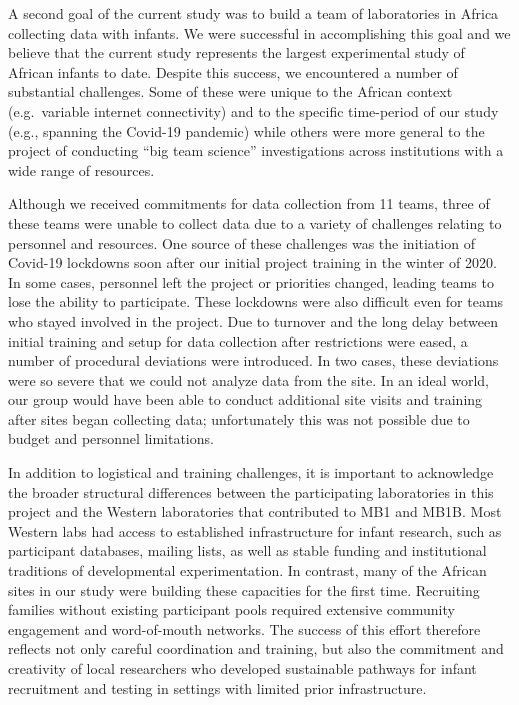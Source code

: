 \documentclass[
  ,man,floatsintext]{apa6}
\begin{document}
A second goal of the current study was to build a team of laboratories in Africa collecting data with infants. We were successful in accomplishing this goal and we believe that the current study represents the largest experimental study of African infants to date. Despite this success, we encountered a number of substantial challenges. Some of these were unique to the African context (e.g.~variable internet connectivity) and to the specific time-period of our study (e.g., spanning the Covid-19 pandemic) while others were more general to the project of conducting ``big team science'' investigations across institutions with a wide range of resources.

Although we received commitments for data collection from 11 teams, three of these teams were unable to collect data due to a variety of challenges relating to personnel and resources. One source of these challenges was the initiation of Covid-19 lockdowns soon after our initial project training in the winter of 2020. In some cases, personnel left the project or priorities changed, leading teams to lose the ability to participate. These lockdowns were also difficult even for teams who stayed involved in the project. Due to turnover and the long delay between initial training and setup for data collection after restrictions were eased, a number of procedural deviations were introduced. In two cases, these deviations were so severe that we could not analyze data from the site. In an ideal world, our group would have been able to conduct additional site visits and training after sites began collecting data; unfortunately this was not possible due to budget and personnel limitations.

In addition to logistical and training challenges, it is important to acknowledge the broader structural differences between the participating laboratories in this project and the Western laboratories that contributed to MB1 and MB1B. Most Western labs had access to established infrastructure for infant research, such as participant databases, mailing lists, as well as stable funding and institutional traditions of developmental experimentation. In contrast, many of the African sites in our study were building these capacities for the first time. Recruiting families without existing participant pools required extensive community engagement and word-of-mouth networks. The success of this effort therefore reflects not only careful coordination and training, but also the commitment and creativity of local researchers who developed sustainable pathways for infant recruitment and testing in settings with limited prior infrastructure.
\end{document}
